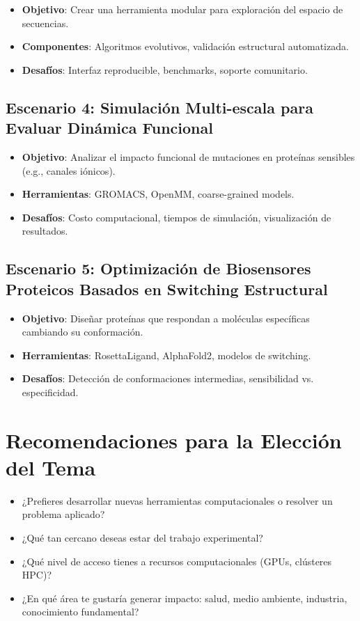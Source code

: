 \documentclass[12pt]{article}
\begin{document}
\begin{itemize}
    \item \textbf{Objetivo}: Crear una herramienta modular para exploración del espacio de secuencias.
    \item \textbf{Componentes}: Algoritmos evolutivos, validación estructural automatizada.
    \item \textbf{Desafíos}: Interfaz reproducible, benchmarks, soporte comunitario.
\end{itemize}

\subsection{Escenario 4: Simulación Multi-escala para Evaluar Dinámica Funcional}

\begin{itemize}
    \item \textbf{Objetivo}: Analizar el impacto funcional de mutaciones en proteínas sensibles (e.g., canales iónicos).
    \item \textbf{Herramientas}: GROMACS, OpenMM, coarse-grained models.
    \item \textbf{Desafíos}: Costo computacional, tiempos de simulación, visualización de resultados.
\end{itemize}

\subsection{Escenario 5: Optimización de Biosensores Proteicos Basados en Switching Estructural}

\begin{itemize}
    \item \textbf{Objetivo}: Diseñar proteínas que respondan a moléculas específicas cambiando su conformación.
    \item \textbf{Herramientas}: RosettaLigand, AlphaFold2, modelos de switching.
    \item \textbf{Desafíos}: Detección de conformaciones intermedias, sensibilidad vs. especificidad.
\end{itemize}

\section{Recomendaciones para la Elección del Tema}

\begin{itemize}
    \item ¿Prefieres desarrollar nuevas herramientas computacionales o resolver un problema aplicado?
    \item ¿Qué tan cercano deseas estar del trabajo experimental?
    \item ¿Qué nivel de acceso tienes a recursos computacionales (GPUs, clústeres HPC)?
    \item ¿En qué área te gustaría generar impacto: salud, medio ambiente, industria, conocimiento fundamental?
\end{itemize}
\end{document}
